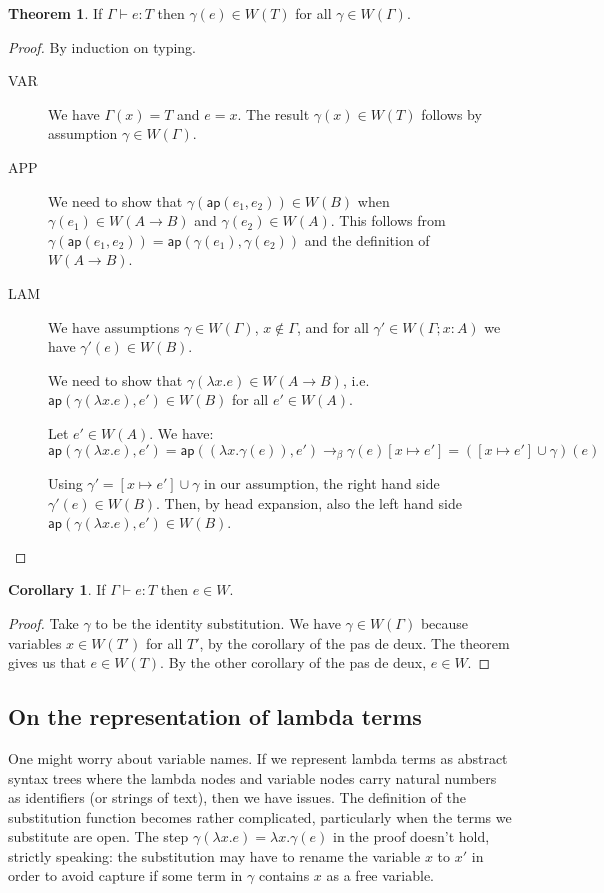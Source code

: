 \documentclass[a4paper, 11pt]{article}
\theoremstyle{definition}
\newtheorem{theorem}{Theorem}
\newtheorem{corollary}{Corollary}
\newcommand{\ap}{\mathsf{ap}}
\newcommand{\G}{\Gamma}
\begin{document}
\begin{theorem}
If $\G \vdash e : T$ then $\gamma(e) \in W(T)$ for all $\gamma \in W(\G)$.
\end{theorem}
\begin{proof}
  By induction on typing.
  \begin{description}
    \item[VAR] We have $\G(x) = T$ and $e = x$. The result $\gamma(x) \in W(T)$ follows by assumption $\gamma \in W(\G)$.

    \item[APP] We need to show that $\gamma(\ap(e_1, e_2)) \in W(B)$ when $\gamma(e_1) \in W(A \to B)$ and $\gamma(e_2) \in W(A)$. This follows from $\gamma(\ap(e_1, e_2)) = \ap(\gamma(e_1),\gamma(e_2))$ and the definition of $W(A \to B)$.

    \item[LAM] We have assumptions $\gamma \in W(\G)$, $x \notin \G$, and for all $\gamma' \in W(\G; x:A)$ we have $\gamma'(e) \in W(B)$.

    We need to show that $\gamma(\lambda x.e) \in W(A \to B)$, i.e. $\ap(\gamma(\lambda x. e),e') \in W(B)$ for all $e' \in W(A)$.

    Let $e' \in W(A)$. We have:
    \[
      \ap(\gamma(\lambda x. e),e') = \ap((\lambda x. \gamma(e)),e') \to_\beta \gamma(e)[x \mapsto e'] = ([x\mapsto e'] \cup \gamma)(e)
    \]

    Using $\gamma' = [x \mapsto e'] \cup \gamma$ in our assumption, the right hand side $\gamma'(e) \in W(B)$. Then, by head expansion, also the left hand side $\ap(\gamma(\lambda x. e),e') \in W(B)$.
  \end{description}
\end{proof}
\begin{corollary}
  If $\G \vdash e : T$ then $e \in W$.
\end{corollary}
\begin{proof}
  Take $\gamma$ to be the identity substitution. We have $\gamma \in W(\G)$ because variables $x \in W(T')$ for all $T'$, by the corollary of the pas de deux. The theorem gives us that $e \in W(T)$. By the other corollary of the pas de deux, $e \in W$.
\end{proof}

\subsection*{On the representation of lambda terms}

One might worry about variable names. If we represent lambda terms as  abstract syntax trees where the lambda nodes and variable nodes carry natural numbers as identifiers (or strings of text), then we have issues. The definition of the substitution function becomes rather complicated, particularly when the terms we substitute are open. The step $\gamma(\lambda x. e) = \lambda x. \gamma(e)$ in the proof doesn't hold, strictly speaking: the substitution may have to rename the variable $x$ to $x'$ in order to avoid capture if some term in $\gamma$ contains $x$ as a free variable.
\end{document}
